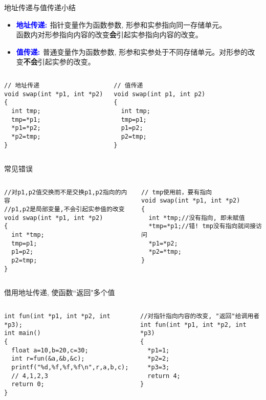 \begin{frame}{地址传递与值传递小结}
\begin{itemize}
	\item \textbf{\textcolor{blue}{地址传递: }}指针变量作为函数参数, 形参和实参指向同一存储单元。\\
	函数内对形参指向内容的改变\textbf{会}引起实参指向内容的改变。
	\item \textbf{\textcolor{blue}{值传递: }}普通变量作为函数参数, 形参和实参处于不同存储单元。对形参的改变\textbf{不会}引起实参的改变。
\end{itemize}
\begin{columns}[T]
\begin{lstlisting}
// 地址传递
void swap(int *p1, int *p2)
{
  int tmp;
  tmp=*p1;
  *p1=*p2;
  *p2=tmp;
}
\end{lstlisting}
\begin{lstlisting}
// 值传递
void swap(int p1, int p2)
{
  int tmp;
  tmp=p1;
  p1=p2;
  p2=tmp;
}
\end{lstlisting}
\end{columns}
\medskip
\end{frame}

\begin{frame}{常见错误}
\begin{columns}[T]
\begin{lstlisting}
//对p1,p2值交换而不是交换p1,p2指向的内容 
//p1,p2是局部变量,不会引起实参值的改变
void swap(int *p1, int *p2)
{
  int *tmp;
  tmp=p1;
  p1=p2;
  p2=tmp;
}
\end{lstlisting}
\begin{lstlisting}
// tmp使用前，要有指向
void swap(int *p1, int *p2)
{
  int *tmp;//没有指向, 即未赋值
  *tmp=*p1;//错! tmp没有指向就间接访问
  *p1=*p2;
  *p2=*tmp;
}
\end{lstlisting}
\end{columns}
\medskip
\end{frame}

\begin{frame}{借用地址传递, 使函数``返回"多个值}
\begin{columns}[T]
\begin{lstlisting}
int fun(int *p1, int *p2, int *p3);
int main()
{
  float a=10,b=20,c=30;
  int r=fun(&a,&b,&c);
  printf("%d,%f,%f,%f\n",r,a,b,c);
  // 4,1,2,3
  return 0;
}
\end{lstlisting}
\begin{lstlisting}
//对指针指向内容的改变, "返回"给调用者
int fun(int *p1, int *p2, int *p3)
{
  *p1=1;
  *p2=2;
  *p3=3;
  return 4;
}
\end{lstlisting}
\end{columns}
\medskip
\end{frame}

